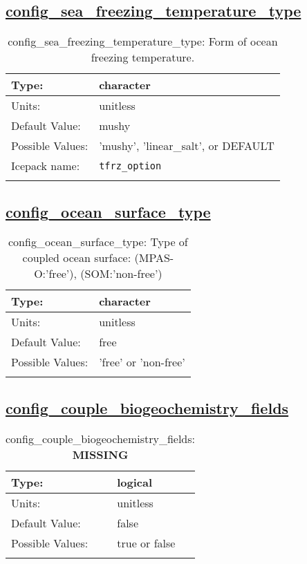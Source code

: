 \subsection[config\_sea\_freezing\_temperature\_type]{\hyperref[sec:nm_tab_ocean]{config\_sea\_freezing\_temperature\_type}}
\label{subsec:nm_sec_config_sea_freezing_temperature_type}
\begin{center}
\begin{longtable}{| p{2.0in} || p{4.0in} |}
    \hline
    Type: & character \\
    \hline
    Units: & \si{unitless} \\
    \hline
    Default Value: & mushy \\
    \hline
    Possible Values: & 'mushy', 'linear\_salt', or DEFAULT \\
    \hline
    \hline
    Icepack name: & \verb+tfrz_option+ \\
    \caption{config\_sea\_freezing\_temperature\_type: Form of ocean freezing temperature.}
\end{longtable}
\end{center}
\subsection[config\_ocean\_surface\_type]{\hyperref[sec:nm_tab_ocean]{config\_ocean\_surface\_type}}
\label{subsec:nm_sec_config_ocean_surface_type}
\begin{center}
\begin{longtable}{| p{2.0in} || p{4.0in} |}
    \hline
    Type: & character \\
    \hline
    Units: & \si{unitless} \\
    \hline
    Default Value: & free \\
    \hline
    Possible Values: & 'free' or 'non-free' \\
    \hline
    \caption{config\_ocean\_surface\_type: Type of coupled ocean surface: (MPAS-O:'free'), (SOM:'non-free')}
\end{longtable}
\end{center}
\subsection[config\_couple\_biogeochemistry\_fields]{\hyperref[sec:nm_tab_ocean]{config\_couple\_biogeochemistry\_fields}}
\label{subsec:nm_sec_config_couple_biogeochemistry_fields}
\begin{center}
\begin{longtable}{| p{2.0in} || p{4.0in} |}
    \hline
    Type: & logical \\
    \hline
    Units: & \si{unitless} \\
    \hline
    Default Value: & false \\
    \hline
    Possible Values: & true or false \\
    \hline
    \caption{config\_couple\_biogeochemistry\_fields: {\bf \color{red} MISSING}}
\end{longtable}
\end{center}
